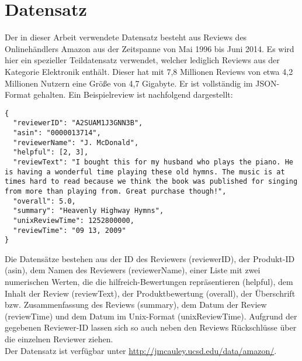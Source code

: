 \documentclass{article}
\begin{document}
\section{Datensatz}
Der in dieser Arbeit verwendete Datensatz besteht aus Reviews des Onlinehändlers Amazon aus der Zeitspanne von Mai 1996 bis Juni 2014. Es wird hier ein spezieller Teildatensatz verwendet, welcher lediglich Reviews aus der Kategorie Elektronik enthält. Dieser hat mit 7,8 Millionen Reviews von etwa 4,2 Millionen Nutzern eine Größe von 4,7 Gigabyte. Er ist vollständig im JSON-Format gehalten. Ein Beispielreview ist nachfolgend dargestellt:

\begin{lstlisting}[breaklines=true]
{ 
  "reviewerID": "A2SUAM1J3GNN3B", 
  "asin": "0000013714", 
  "reviewerName": "J. McDonald", 
  "helpful": [2, 3], 
  "reviewText": "I bought this for my husband who plays the piano. He is having a wonderful time playing these old hymns. The music is at times hard to read because we think the book was published for singing from more than playing from. Great purchase though!", 
  "overall": 5.0, 
  "summary": "Heavenly Highway Hymns", 
  "unixReviewTime": 1252800000, 
  "reviewTime": "09 13, 2009" 
}
\end{lstlisting}

Die Datensätze bestehen aus der ID des Reviewers (reviewerID), der Produkt-ID (asin), dem Namen des Reviewers (reviewerName), einer Liste mit zwei numerischen Werten, die die hilfreich-Bewertungen repräsentieren (helpful), dem Inhalt der Review (reviewText), der Produktbewertung (overall), der Überschrift bzw. Zusammenfassung des Reviews (summary), dem Datum der Review (reviewTime) und dem Datum im Unix-Format (unixReviewTime). Aufgrund der gegebenen Reviewer-ID lassen sich so auch neben den Reviews Rückschlüsse über die einzelnen Reviewer ziehen.\\
Der Datensatz ist verfügbar unter \url{http://jmcauley.ucsd.edu/data/amazon/}.
\end{document}
